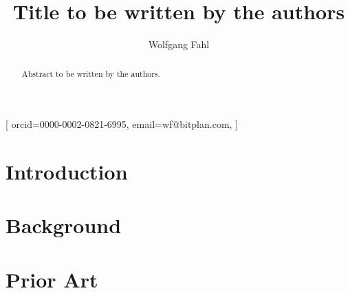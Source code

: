 \documentclass{ceurart}
\begin{document}


\title{Title to be written by the authors}
\tnotemark[1]

\author[1,2]{Wolfgang Fahl}[%
orcid=0000-0002-0821-6995,
email=wf@bitplan.com,
]
\cormark[1]
\address[1]{RWTH Aachen University, Computer Science i5, Aachen, Germany}
\address[2]{BITPlan GmbH, Willich, Germany}

\begin{abstract}
Abstract to be written by the authors.
\end{abstract}

\begin{keywords}
\end{keywords}

\maketitle

\section{Introduction}\label{sec:introduction}

\section{Background}\label{sec:background}

\section{Prior Art}\label{sec:priorart}
\end{document}
